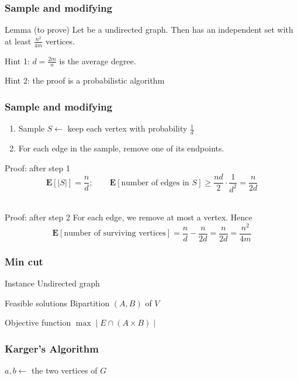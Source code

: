 \begin{frame}[fragile]
	\frametitle{Sample and modifying}
	\begin{block}{Lemma (to prove)}
		Let \g be a undirected graph.
		Then \g has an independent set with at least \(\frac{n^{2}}{4m}\) vertices.
	\end{block}\pause

	Hint 1: \(d = \frac{2m}{n}\) is the average degree.

	Hint 2: the proof is a probabilistic algorithm
\end{frame}

\begin{frame}[fragile]
	\frametitle{Sample and modifying}
	\begin{enumerate}
		\item
		      Sample $S\gets $ keep each vertex with probability $\frac{1}{d}$
		\item
		      For each edge in the sample, remove one of its endpoints.
	\end{enumerate}\pause
	\begin{block}{Proof: after step 1}
		$$\textbf{E}[|S|] = \frac{n}{d}; \qquad
			\textbf{E}[\text{number of edges in }S] \ge \frac{nd}{2} \cdot \frac{1}{d^{2}} = \frac{n}{2d}$$\\
	\end{block}\pause
	\begin{block}{Proof: after step 2}
		For each edge, we remove at most a vertex.
		Hence
		\[\textbf{E}[\text{number of surviving vertices}] = \frac{n}{d} - \frac{n}{2d} = \frac{n}{2d} = \frac{n^{2}}{4m}\]
	\end{block}
\end{frame}

\begin{frame}[fragile]
	\frametitle{Min cut}
	\begin{block}{Instance}
		Undirected graph \g
	\end{block}
	\begin{block}{Feasible solutions}
		Bipartition $(A,B)$ of $V$
	\end{block}
	\begin{block}{Objective function}
		$\max \mid E \cap (A\times B)\mid$
	\end{block}
\end{frame}

\begin{frame}[fragile]
	\frametitle{Karger's Algorithm}

	\begin{algorithm}[H]
		$a,b\gets$ the two vertices of $G$\;
	\end{algorithm}
\end{frame}

